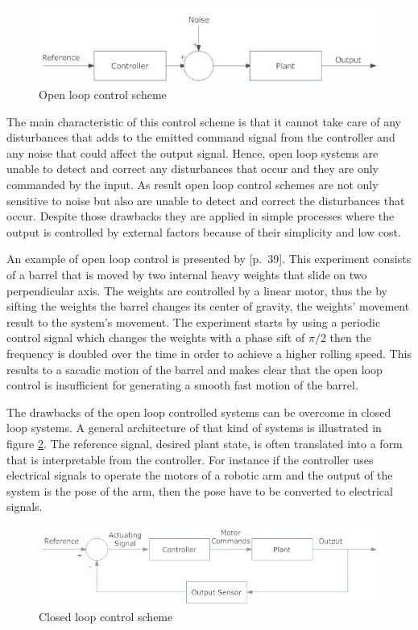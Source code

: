 \documentclass[msc,ai,logo]{infthesis}
\begin{document}
\begin{figure}[h]
\includegraphics[scale=0.5]{openloop.jpg}
\centering
\caption{Open loop control scheme}
\label{fig:openloop}
\end{figure}

The main characteristic of this control scheme is that it cannot take care of any disturbances that adds to the emitted command signal from the controller and any noise that could affect the output signal. Hence, open loop systems are unable to detect and correct any disturbances that occur and they are only commanded by the input. As result open loop control schemes are not only sensitive to noise but also are unable to detect and correct the disturbances that occur.
Despite those drawbacks they are applied in simple processes where the output is controlled by external factors because of their simplicity and low cost. 

An example of open loop control is presented by \cite  {DerMartius11} [p.~39]. This experiment consists of a barrel that is moved by two internal heavy weights that slide on two perpendicular axis. The weights are controlled by a linear motor, thus the by sifting the weights the barrel changes its center of gravity, the weights' movement result to the system's movement. The experiment starts by using a periodic control signal which changes the weights with a phase sift of $ \pi/2 $ then the frequency is doubled over the time in order to achieve a higher rolling speed. This results to a sacadic motion of the barrel and makes clear that the open loop control is insufficient for generating a smooth fast motion of the barrel.   

The drawbacks of the open loop controlled systems can be overcome in closed loop systems. A general architecture of that kind of systems is illustrated in figure \ref{fig:closloop}. The reference signal, desired plant state, is often translated into a form that is interpretable from the controller. For instance if the controller uses electrical signals to operate the motors of a robotic arm and the output of the system is the pose of the arm, then the pose have to be converted to electrical signals. 
\begin{figure}[h]
\includegraphics[scale=0.6]{closedlloop.jpg}
\centering
\caption{Closed loop control scheme}
\label{fig:closloop}
\end{figure}
\end{document}
